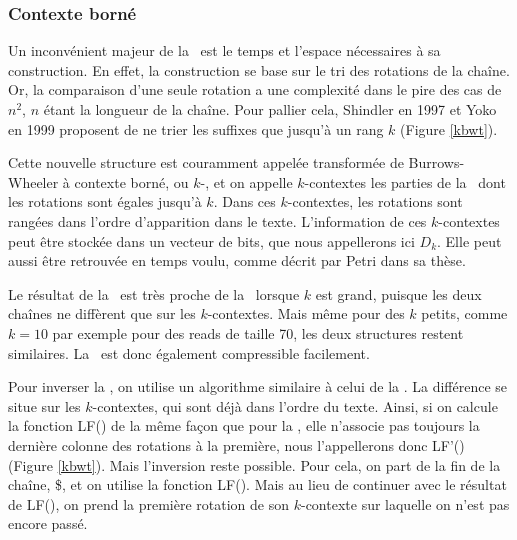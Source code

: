 \subsubsection{Contexte borné}
Un inconvénient majeur de la \bwt\ est le temps et l'espace nécessaires à sa construction. En effet, la construction se base sur le tri des rotations de la chaîne. Or, la comparaison d'une seule rotation a une complexité dans le pire des cas de $n^2$, $n$ étant la longueur de la chaîne.
Pour pallier cela, Shindler en 1997 et Yoko en 1999 proposent de ne trier les suffixes que jusqu'à un rang $k$ (Figure \ref{kbwt}).

Cette nouvelle structure est couramment appelée transformée de Burrows-Wheeler à contexte borné, ou $k$-\bwt, et on appelle $k$-contextes les parties de la \kbwt\ dont les rotations sont égales jusqu'à $k$. Dans ces $k$-contextes, les rotations sont rangées dans l'ordre d'apparition dans le texte. L'information de ces $k$-contextes peut être stockée dans un vecteur de bits, que nous appellerons ici $D_k$. Elle peut aussi être retrouvée en temps voulu, comme décrit par Petri dans sa thèse.

Le résultat de la \kbwt\ est très proche de la \bwt\ lorsque $k$ est grand, puisque les deux chaînes ne diffèrent que sur les $k$-contextes. Mais même pour des $k$ petits, comme $k = 10$ par exemple pour des reads de taille 70, les deux structures restent similaires. La \kbwt\ est donc également compressible facilement.

Pour inverser la \kbwt, on utilise un algorithme similaire à celui de la \bwt. La différence se situe sur les $k$-contextes, qui sont déjà dans l'ordre du texte. Ainsi, si on calcule la fonction LF() de la même façon que pour la \bwt, elle n'associe pas toujours la dernière colonne des rotations à la première, nous l'appellerons donc LF'() (Figure \ref{kbwt}). Mais l'inversion reste possible. Pour cela, on part de la fin de la chaîne, \$, et on utilise la fonction LF(). Mais au lieu de continuer avec le résultat de LF(), on prend la première rotation de son $k$-contexte sur laquelle on n'est pas encore passé.


